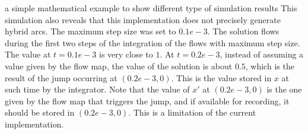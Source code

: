 \begin{example}{a simple mathematical example to show different type of simulation results}
This simulation also reveals that this implementation does not
precisely generate hybrid arcs. The maximum step size was set to $0.1
e-3$. The solution flows during the first two steps of the integration
of the flows with maximum step size. The value at $t=0.1e-3$ is very
close to $1$. At $t=0.2e-3$, instead of assuming a value given by the
flow map, the value of the solution is about $0.5$, which is the
result of the jump occurring at $(0.2e-3,0)$. This is the value stored
in $x$ at such time by the integrator. Note that the value of $x'$ at
$(0.2e-3,0)$ is the one given by the flow map that triggers the jump,
and if available for recording, it should be stored in $(0.2e-3,0)$.
This is a limitation of the current implementation.
%



\end{example}
